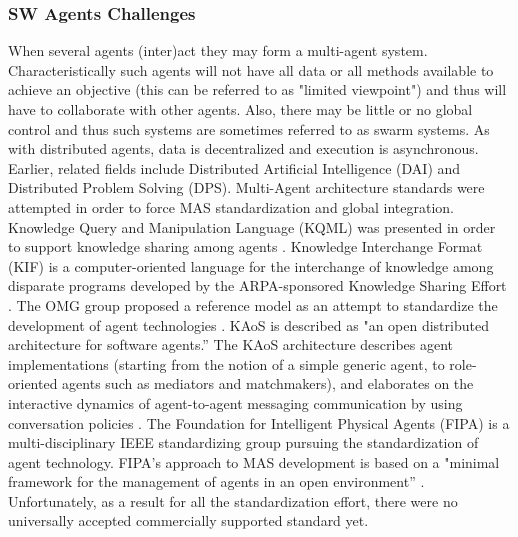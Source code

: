 \documentclass[12pt,a4paper,final,twoside,onecolumn,titlepage]{book}
\begin{document}
\subsubsection{SW Agents Challenges}
When several agents (inter)act they may form a multi-agent system. Characteristically such agents will not have all data or all methods available to achieve an objective (this can be referred to as "limited viewpoint") and thus will have to collaborate with other agents. Also, there may be little or no global control and thus such systems are sometimes referred to as swarm systems. As with distributed agents, data is decentralized and execution is asynchronous. Earlier, related fields include Distributed Artificial Intelligence (DAI) and Distributed Problem Solving (DPS).
Multi-Agent architecture standards were attempted in order to force \gls{MAS} standardization and global integration. Knowledge Query and Manipulation Language (\gls{KQML}) was presented in order to support knowledge sharing among agents \cite{BS50}. Knowledge Interchange Format (\gls{KIF}) is a computer-oriented language for the interchange of knowledge among disparate programs developed by the \gls{ARPA}-sponsored Knowledge Sharing Effort \cite{R41}. The OMG group proposed a reference model as an attempt to standardize the development of agent technologies \cite{R42}. \gls{KAoS} is described as "an open distributed architecture for software agents.'' The \gls{KAoS} architecture describes agent implementations (starting from the notion of a simple generic agent, to role-oriented agents such as mediators and matchmakers), and elaborates on the interactive dynamics of agent-to-agent messaging communication by using conversation policies \cite{R43}. The Foundation for Intelligent Physical Agents (\gls{FIPA}) is a multi-disciplinary IEEE standardizing group pursuing the standardization of agent technology. \gls{FIPA}'s approach to \gls{MAS} development is based on a "minimal framework for the management of agents in an open environment'' \cite{R44}. Unfortunately, as a result for all the standardization effort, there were no universally accepted commercially supported standard yet.
\end{document}

